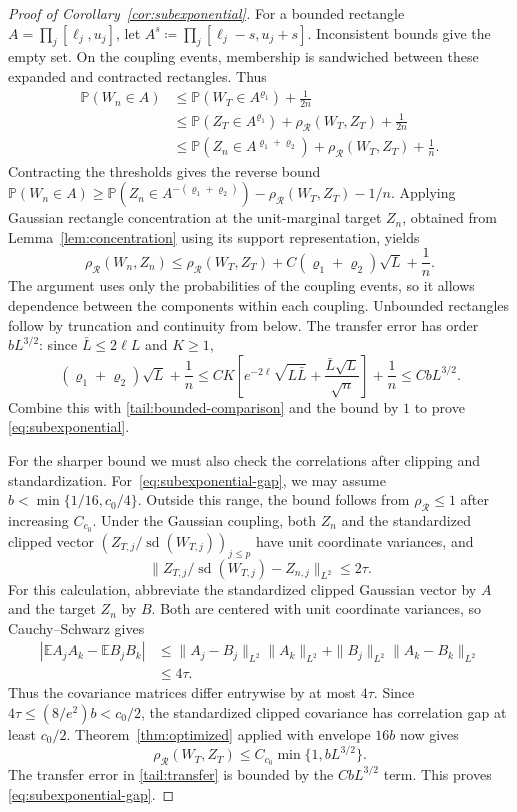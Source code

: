 \documentclass[11pt,letterpaper]{article}
\theoremstyle{remark}
\newcommand{\E}{\mathbb E}
\newcommand{\Pp}{\mathbb P}
\newcommand{\rh}{\rho_{\mathcal R}}
\begin{document}
\begin{proof}[Proof of Corollary~\ref{cor:subexponential}]
For a bounded rectangle \(A=\prod_j[\ell_j,u_j]\), let
\(A^s\coloneqq\prod_j[\ell_j-s,u_j+s]\). Inconsistent bounds
give the empty set. On the coupling events, membership is sandwiched
between these expanded and contracted rectangles. Thus
\begin{align*}
 \Pp(W_n\in A)
 &\le\Pp(W_T\in A^{\varrho_1})+\frac1{2n}\\
 &\le\Pp(Z_T\in A^{\varrho_1})+\rh(W_T,Z_T)+\frac1{2n}\\
 &\le\Pp(Z_n\in A^{\varrho_1+\varrho_2})+\rh(W_T,Z_T)+\frac1n.
\end{align*}
Contracting the thresholds gives the reverse bound
\(\Pp(W_n\in A)\ge\Pp(Z_n\in A^{-(\varrho_1+\varrho_2)})
-\rh(W_T,Z_T)-1/n\). Applying Gaussian rectangle concentration at
the unit-marginal target \(Z_n\), obtained from Lemma~\ref{lem:concentration}
using its support representation, yields
\begin{equation}
 \rh(W_n,Z_n)\le\rh(W_T,Z_T)
       +C(\varrho_1+\varrho_2)\sqrt L+\frac1n.
 \label{tail:transfer}
\end{equation}
The argument uses only the probabilities of the coupling events,
so it allows dependence between the components within each coupling. Unbounded
rectangles follow by truncation and continuity from below.
The transfer error has order \(bL^{3/2}\): since
\(\bar L\le2\ell L\) and \(K\ge1\),
\[
 (\varrho_1+\varrho_2)\sqrt L+\frac1n
 \le CK\left[e^{-2\ell}\sqrt{L\bar L}
                     +\frac{\bar L\sqrt L}{\sqrt n}\right]+\frac1n
 \le CbL^{3/2}.
\]
Combine this with \eqref{tail:bounded-comparison} and the bound by \(1\)
to prove \eqref{eq:subexponential}.

For the sharper bound we must also check the correlations after
clipping and standardization. For~\eqref{eq:subexponential-gap}, we may assume
\(b<\min\{1/16,c_0/4\}\). Outside this range, the bound follows from
\(\rh\le1\) after increasing \(C_{c_0}\).
Under the Gaussian coupling, both \(Z_n\) and the standardized clipped
vector \((Z_{T,j}/\operatorname{sd}(W_{T,j}))_{j\le p}\) have unit coordinate variances, and
\[
 \|Z_{T,j}/\operatorname{sd}(W_{T,j})-Z_{n,j}\|_{L^2}\le2\tau.
\]
For this calculation, abbreviate the standardized clipped Gaussian
vector by \(A\) and the target \(Z_n\) by \(B\). Both are centered
with unit coordinate variances, so Cauchy--Schwarz gives
\[
 \begin{aligned}
 |\E A_jA_k-\E B_jB_k|
 &\le\|A_j-B_j\|_{L^2}\|A_k\|_{L^2}
       +\|B_j\|_{L^2}\|A_k-B_k\|_{L^2}\\
 &\le4\tau.
 \end{aligned}
\]
Thus the covariance matrices differ entrywise by at most \(4\tau\). Since
\(4\tau\le(8/e^2)b<c_0/2\), the standardized clipped covariance
has correlation gap at least \(c_0/2\).
Theorem~\ref{thm:optimized} applied with envelope \(16b\) now gives
\[
 \rh(W_T,Z_T)\le C_{c_0}\min\{1,bL^{3/2}\}.
\]
The transfer error in \eqref{tail:transfer} is bounded by the
\(CbL^{3/2}\) term. This proves \eqref{eq:subexponential-gap}.


\end{proof}
\end{document}
